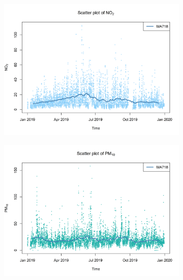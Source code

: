 \documentclass[a4paper, 10pt]{article}
\begin{document}
\begin{flushleft}
      \begin{figure}[H]
         \centering
         \begin{subfigure}[t]{0.48\linewidth}
            \centering
            \includegraphics[width=\linewidth]{../images/no2_scatter_2019.png}
         \end{subfigure}
         \hfill
         \begin{subfigure}[t]{0.48\linewidth}
            \centering
            \includegraphics[width=\linewidth]{../images/pm10_scatter_2019.png}
         \end{subfigure}

         \vfill


\end{figure}
\end{flushleft}
\end{document}

